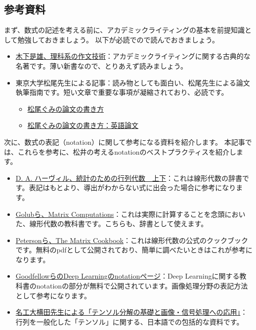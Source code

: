 \documentclass[uplatex,twocolumn,9pt,dvipdfmx]{jsarticle}
\begin{document}
\subsection{参考資料}
まず、数式の記述を考える前に、アカデミックライティングの基本を前提知識として勉強しておきましょう。
以下が必読でので読んでおきましょう。
\begin{itemize}
    \item \href{https://www.amazon.co.jp/dp/4121006240}{木下是雄、理科系の作文技術}：アカデミックライティングに関する古典的な名著です。薄い新書なので、とりあえず読みましょう。
    \item 東京大学松尾先生による記事：読み物としても面白い、松尾先生による論文執筆指南です。短い文章で重要な事項が凝縮されており、必読です。
    \begin{itemize}
        \item \href{http://ymatsuo.com/japanese/ronbun_jpn.html}{松尾ぐみの論文の書き方}
        \item \href{http://ymatsuo.com/japanese/ronbun_eng.html}{松尾ぐみの論文の書き方：英語論文}
    \end{itemize}
\end{itemize}

次に、数式の表記（notation）に関して参考になる資料を紹介します。
本記事では、これらを参考に、松井の考えるnotationのベストプラクティスを紹介します。
\begin{itemize}
    \item \href{https://www.amazon.co.jp/dp/4621061453}{D. A. ハーヴィル、統計のための行列代数　上下}：これは線形代数の辞書です。表記はもとより、導出がわからない式に出会った場合に参考になります。
    \item \href{https://www.amazon.co.jp/dp/1421407949}{Golubら、Matrix Computations}：これは実際に計算することを念頭においた、線形代数の教科書です。こちらも、辞書として使えます。
    \item \href{http://www2.imm.dtu.dk/pubdb/pubs/3274-full.html}{Petersonら、The Matrix Cookbook}：これは線形代数の公式のクックブックです。無料のpdfとして公開されており、簡単に調べたいときはこれが参考になります。
    \item \href{https://www.deeplearningbook.org/contents/notation.html}{GoodfellowらのDeep Learningのnotationページ}：Deep Learningに関する教科書のnotationの部分が無料で公開されています。画像処理分野の表記方法として参考になります。
    \item \href{https://www.slideshare.net/yokotatsuya/2014-3-13}{名工大横田先生による「テンソル分解の基礎と画像・信号処理への応用」}：行列を一般化した「テンソル」に関する、日本語での包括的な資料です。
\end{itemize}
\end{document}
